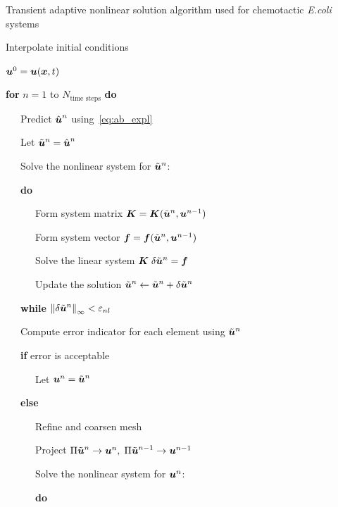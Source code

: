 \begin{algorithm}[!htb]
  \caption{Transient adaptive nonlinear solution algorithm used for chemotactic \emph{E.coli} systems\label{alg:bio_algorithm}}
 \noindent
  \centering
    \begin{minipage}{.95\textwidth}
      \noindent
      \sffamily
      \setcounter{alines}{0}
      \begin{list}{:\ \ }{}
        \renewcommand{\baselinestretch}{1.0} \setlength{\itemsep}{-1ex}
        \item Interpolate initial conditions
	\item $\bv{u}^0 = \bv{u}(\bv{x},t)$ 
        \item \textbf{for} $n=1$ to $N_\text{time steps}$ \textbf{do}
	\item \ \ \ Predict $\hat{\bv{u}}^n$ using~\eqref{eq:ab_expl}
	\item \ \ \ Let $\tilde{\bv{u}}^n = \hat{\bv{u}}^n$
	\item \ \ \ Solve the nonlinear system for $\tilde{\bv{u}}^n$:
 	\item \ \ \ \textbf{do}
 	\item \ \ \ \ \ \ Form system matrix $\bt{K} = \bt{K}(\tilde{\bv{u}}^n,\bv{u}^{n-1})$
 	\item \ \ \ \ \ \ Form system vector $\bv{f}= \bv{f}(\tilde{\bv{u}}^n,\bv{u}^{n-1})$
 	\item \ \ \ \ \ \ Solve the linear system $\bt{K} \; \delta\tilde{\bv{u}}^n = \bv{f}$
	\item \ \ \ \ \ \ Update the solution $\tilde{\bv{u}}^n \leftarrow \tilde{\bv{u}}^n + \delta\tilde{\bv{u}}^n$
 	\item \ \ \ \textbf{while} $\norm[\infty]{\delta\tilde{\bv{u}}^n} < \varepsilon_{nl}$
	\item \ \ \ Compute error indicator for each element using $\tilde{\bv{u}}^n$
	\item \ \ \ \textbf{if} error is acceptable
	\item \ \ \ \ \ \ Let $\bv{u}^n=\tilde{\bv{u}}^n$
        \item \ \ \ \textbf{else}
	\item \ \ \ \ \ \ Refine and coarsen mesh
	\item \ \ \ \ \ \ Project $\Pi\tilde{\bv{u}}^n\rightarrow\bv{u}^n,\;\Pi\tilde{\bv{u}}^{n-1}\rightarrow\bv{u}^{n-1}$
	\item \ \ \ \ \ \ Solve the nonlinear system for $\bv{u}^n$:
 	\item \ \ \ \ \ \ \textbf{do}

\end{list}
\end{minipage}
\end{algorithm}
